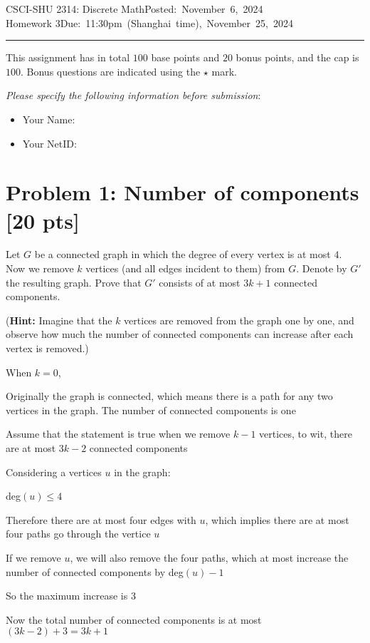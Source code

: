 \documentclass[11pt,twoside]{article}
\newcommand{\homework}[1]{
   \pagestyle{myheadings}
   \thispagestyle{plain}
   \newpage
   \setcounter{page}{1}
   \noindent
   \classname \hfill \mbox{\updatedday} \\
   \instname \hfill \mbox{\duedate}
   \rule{6.5in}{0.5mm}
   \vspace*{-0.1 in}
}
\newcommand{\problem}[1]{\section*{Problem #1}}
\def\classname{CSCI-SHU 2314: Discrete Math}
\def\updatedday{Posted: November 6, 2024}
\def\duedate{Due: 11:30pm (Shanghai time), November 25, 2024}
\def\instname{Homework 3}
\begin{document}
\homework{1}

This assignment has in total $100$ base points and $20$ bonus points, and the cap is $100$.
Bonus questions are indicated using the $\star$ mark.

\textit{Please specify the following information before submission}:
\begin{itemize}
    \item Your Name:%
    \item Your NetID: %
\end{itemize}




\problem{1: Number of components [20 pts]} 

Let $G$ be a connected graph in which the degree of every vertex is at most $4$.
Now we remove $k$ vertices (and all edges incident to them) from $G$.
Denote by $G'$ the resulting graph.
Prove that $G'$ consists of at most $3k+1$ connected components.

(\textbf{Hint:} Imagine that the $k$ vertices are removed from the graph one by one, and observe how much the number of connected components can increase after each vertex is removed.)

\hspace*{\fill}

When $k = 0$, 

Originally the graph is connected, which means there is a path for any two vertices in the graph. The number of connected components is one

Assume that the statement is true when we remove $k-1$ vertices, to wit, there are at most $3k-2$ connected components

Considering a vertices $u$ in the graph:

deg$(u) \leq 4$

Therefore there are at most four edges with $u$, which implies there are at most four paths go through the vertice $u$

If we remove $u$, we will also remove the four paths, which at most increase the number of connected components by deg$(u) - 1$

So the maximum increase is 3

Now the total number of connected components is at most $(3k-2)+3 = 3k+1$
\end{document}
